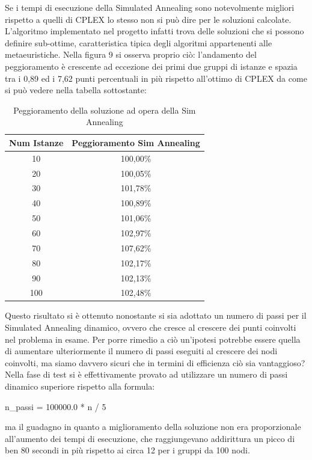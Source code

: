 \documentclass[preprint,12pt]{elsarticle}
\begin{document}
Se i tempi di esecuzione della Simulated Annealing sono notevolmente migliori rispetto a quelli di CPLEX lo stesso non si può dire per le soluzioni calcolate. L'algoritmo implementato nel progetto infatti trova delle soluzioni che si possono definire sub-ottime, caratteristica tipica degli algoritmi appartenenti alle metaeuristiche. Nella figura 9 si osserva proprio ciò: l'andamento del peggioramento è crescente ad eccezione dei primi due gruppi di istanze e spazia tra i 0,89 ed i 7,62 punti percentuali in più rispetto all'ottimo di CPLEX da come si può vedere nella tabella sottostante: 

\begin{table}[htbp]
\caption {Peggioramento della soluzione ad opera della Sim Annealing} \label{tab:title} 
\begin{center}
\begin{tabular}{|c|c|}
\hline 
Num Istanze & Peggioramento Sim Annealing \\ 
\hline 
10 & 100,00\% \\ 
\hline 
20 & 100,05\% \\ 
\hline 
30 & 101,78\% \\ 
\hline 
40 & 100,89\% \\ 
\hline 
50 & 101,06\% \\ 
\hline 
60 & 102,97\% \\ 
\hline 
70 & 107,62\% \\ 
\hline 
80 & 102,17\% \\ 
\hline 
90 & 102,13\% \\ 
\hline 
100 & 102,48\% \\ 
\hline 
\end{tabular} 
\end{center}
\end{table}


Questo risultato si è ottenuto nonostante si sia adottato un numero di passi per il Simulated Annealing dinamico, ovvero che cresce al crescere dei punti coinvolti nel problema in esame. Per porre rimedio a ciò un'ipotesi potrebbe essere quella di aumentare ulteriormente il numero di passi eseguiti al crescere dei nodi coinvolti, ma siamo davvero sicuri che in termini di efficienza ciò sia vantaggioso? Nella fase di test si è effettivamente provato ad utilizzare un numero di passi dinamico superiore rispetto alla formula:

\begin{center}
n\_passi = 100000.0 * n / 5
\end{center}
ma il guadagno in quanto a miglioramento della soluzione non era proporzionale all'aumento dei tempi di esecuzione, che raggiungevano addirittura un picco di ben 80 secondi in più rispetto ai circa 12 per i gruppi da 100 nodi. 
\end{document}
